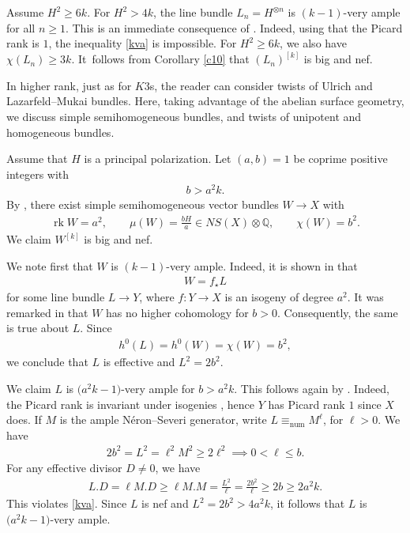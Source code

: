 \documentclass[10pt,a4paper]{amsart}
\numberwithin{equation}{section}
\newcommand{\rk}{\operatorname{rk}}
\begin{document}
\begin{Example}%
Assume $H^2\geq 6k$. For $H^2>4k$, the line bundle $L_n=H^{\otimes n}$ is $(k-1)$-very ample for all $n\geq 1$. This is an immediate consequence of \cite[Theorem 2.1]{BS}. Indeed, using that the Picard rank is $1$, the inequality \eqref{kva} is impossible. For $H^2\geq 6k$, we also have $\chi(L_n)\geq 3k$. It~follows from Corollary \ref{c10} that $(L_n)^{[k]}$ is big and nef.
\end{Example}

In higher rank, just as for $K3$s, the reader can consider twists of Ulrich and Lazarfeld--Mukai bundles. Here, taking advantage of the abelian surface geometry, we discuss simple semihomogeneous bundles, and twists of unipotent and homogeneous bundles.
\begin{Example}%
 Assume that $H$ is a principal polarization. Let $(a, b)=1$ be coprime positive integers with
 \begin{gather*}
 b>a^2k.
 \end{gather*}
 By \cite[Remark 7.13]{M}, there exist simple semihomogeneous vector bundles $W\to X$ with
 {\samepage\begin{gather*}
 \rk W=a^2, \qquad \mu(W)=\frac{bH}{a}\in NS(X)\otimes \mathbb Q, \qquad \chi(W)=b^2.
 \end{gather*}
 We claim $W^{[k]}$ is big and nef.}

We note first that $W$ is $(k-1)$-very ample. Indeed, it is shown in \cite[Theorem 5.8] {M} that
\begin{gather*}
W=f_{\star} L
\end{gather*}
for some line bundle $L\to Y$, where $f\colon Y\to X$ is an isogeny of degree $a^2$. It was remarked in \cite[Section 2.4]{Op} that $W$ has no higher cohomology for $b>0$. Consequently, the same is true about $L$. Since
\begin{gather*}
h^0(L)=h^0(W)=\chi(W)=b^2,
\end{gather*}
we conclude that $L$ is effective and $L^2=2b^2$.

We claim $L$ is $\big(a^2k-1\big)$-very ample for $b>a^2k$. This follows again by \cite[Theorem 2.1]{BS}. Indeed, the Picard rank is invariant under isogenies \cite[Proposition~3.2]{BL}, hence $Y$ has Picard rank $1$ since $X$ does. If $M$ is the ample N\'eron--Severi generator, write $L\equiv_{\text{num}} M^{\ell}$, for $\ell> 0$. We have
\begin{gather*}
2b^2=L^2=\ell^2 M^2\geq 2\ell^2\implies 0< \ell \leq b.
\end{gather*}
For any effective divisor $D\neq 0$, we have
\begin{gather*}
L.D= \ell M.D\geq \ell M.M=\frac{L^2}{\ell}=\frac{2b^2}{\ell}\geq 2b\geq 2a^2k.
\end{gather*}
This violates \eqref{kva}. Since $L$ is nef and $L^2=2b^2>4a^2k$, it follows that $L$ is $\big(a^2k-1\big)$-very ample.


\end{Example}
\end{document}
